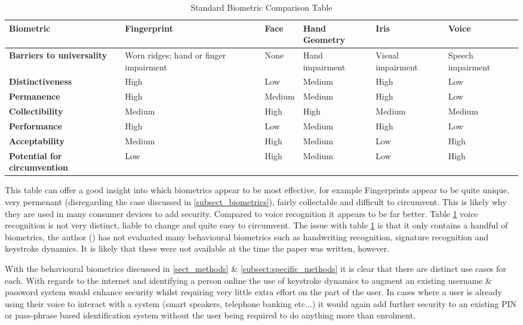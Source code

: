 \documentclass[12pt]{article}
\begin{document}
    \begin{table}[H]
        \centering
        \begin{tabular}{|p{3cm}|p{2.5cm}|p{1.5cm}|p{2cm}|p{2cm}|p{2cm}|}
            \hline
             \textbf{Biometric} & \textbf{Fingerprint} & \textbf{Face} & \textbf{Hand Geometry} & \textbf{Iris} & \textbf{Voice} \\
             \hline
             \textbf{Barriers to universality} & Worn ridges; hand or finger impairment & None & Hand impairment & Visual impairment & Speech impairment \\\hline
             \textbf{Distinctiveness} & High & Low & Medium & High & Low\\\hline
             \textbf{Permanence} & High & Medium & Medium & High & Low\\\hline
             \textbf{Collectibility} & Medium & High & High & Medium & Medium\\\hline
             \textbf{Performance} & High & Low & Medium & High & Low \\\hline
             \textbf{Acceptability} & Medium & High & Medium & Low & High \\\hline
             \textbf{Potential for circumvention} & Low & High & Medium & Low & High \\\hline
        \end{tabular}
        \caption{Standard Biometric Comparison Table \citep{prabhakar2003biometric}}
        \label{tab:common_comparison}
    \end{table}
	
	This table can offer a good insight into which biometrics appear to be most effective, for example Fingerprints appear to be quite unique, very permenant (disregarding the case discussed in \ref{subsect_biometrics}), fairly collectable and difficult to circumvent. This is likely why they are used in many consumer devices to add security. Compared to voice recognition it appears to be far better. Table \ref{tab:common_comparison} voice recognition is not very distinct, liable to change and quite easy to circumvent.
	The issue with table \ref{tab:common_comparison} is that it only contains a handful of biometrics, the author (\cite{prabhakar2003biometric}) has not evaluated many behavioural biometrics such as handwriting recognition, signature recognition and keystroke dynamics. It is likely that these were not available at the time the paper was written, however.
	
	With the behavioural biometrics discussed in \ref{sect_methods} \& \ref{subsect:specific_methods} it is clear that there are distinct use cases for each. With regards to the internet and identifying a person online the use of keystroke dynamics to augment an existing username \& password system would enhance security whilst requiring very little extra effort on the part of the user. In cases where a user is already using their voice to interact with a system (smart speakers, telephone banking etc...) it would again add further security to an existing PIN or pass-phrase based identification system without the user being required to do anything more than enrolment.
	
\end{document}

